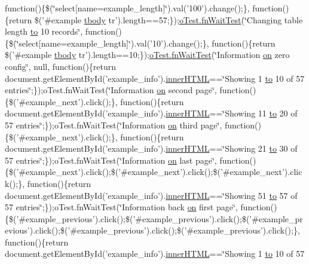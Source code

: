 \begin{DoxyCompactItemize}
function()\{\$(\char`\"{}select\mbox{[}name=example\+\_\+length\mbox{]}\char`\"{}).val('100').change();\}, function()\{return \$('\#example \hyperlink{core_8constructor_8js_a99b0542c7c50fe8757c55bf9dac5f3be}{tbody} tr').length==57;\});\hyperlink{onhold_24__server-side_2__zero__config_8js_ab25c4d596771c0133cdc45178ce72c3d}{o\+Test.\+fn\+Wait\+Test}(\char`\"{}Changing table length \hyperlink{jquery-ui_8js_af6086621f45baa2cf538f19e45d3c263}{to} 10 records\char`\"{}, function()\{\$(\char`\"{}select\mbox{[}name=example\+\_\+length\mbox{]}\char`\"{}).val('10').change();\}, function()\{return \$('\#example \hyperlink{core_8constructor_8js_a99b0542c7c50fe8757c55bf9dac5f3be}{tbody} tr').length==10;\});\hyperlink{onhold_24__server-side_2__zero__config_8js_ab25c4d596771c0133cdc45178ce72c3d}{o\+Test.\+fn\+Wait\+Test}(\char`\"{}Information \hyperlink{fullpage_2plugin_8min_8js_a1cfa98b7fed2aaf9fee3b68dbb7f9497}{on} zero config\char`\"{}, null, function()\{return document.\+get\+Element\+By\+Id('example\+\_\+info').\hyperlink{jquery-ui_8js_a87f73c4f0391c1cf9fe60374a76d9a7b}{inner\+H\+T\+M\+L}==\char`\"{}Showing 1 \hyperlink{jquery-ui_8js_af6086621f45baa2cf538f19e45d3c263}{to} 10 of 57 entries\char`\"{};\});o\+Test.\+fn\+Wait\+Test(\char`\"{}Information \hyperlink{fullpage_2plugin_8min_8js_a1cfa98b7fed2aaf9fee3b68dbb7f9497}{on} second page\char`\"{}, function()\{\$('\#example\+\_\+next').click();\}, function()\{return document.\+get\+Element\+By\+Id('example\+\_\+info').\hyperlink{jquery-ui_8js_a87f73c4f0391c1cf9fe60374a76d9a7b}{inner\+H\+T\+M\+L}==\char`\"{}Showing 11 \hyperlink{jquery-ui_8js_af6086621f45baa2cf538f19e45d3c263}{to} 20 of 57 entries\char`\"{};\});o\+Test.\+fn\+Wait\+Test(\char`\"{}Information \hyperlink{fullpage_2plugin_8min_8js_a1cfa98b7fed2aaf9fee3b68dbb7f9497}{on} third page\char`\"{}, function()\{\$('\#example\+\_\+next').click();\}, function()\{return document.\+get\+Element\+By\+Id('example\+\_\+info').\hyperlink{jquery-ui_8js_a87f73c4f0391c1cf9fe60374a76d9a7b}{inner\+H\+T\+M\+L}==\char`\"{}Showing 21 \hyperlink{jquery-ui_8js_af6086621f45baa2cf538f19e45d3c263}{to} 30 of 57 entries\char`\"{};\});o\+Test.\+fn\+Wait\+Test(\char`\"{}Information \hyperlink{fullpage_2plugin_8min_8js_a1cfa98b7fed2aaf9fee3b68dbb7f9497}{on} last page\char`\"{}, function()\{\$('\#example\+\_\+next').click();\$('\#example\+\_\+next').click();\$('\#example\+\_\+next').click();\}, function()\{return document.\+get\+Element\+By\+Id('example\+\_\+info').\hyperlink{jquery-ui_8js_a87f73c4f0391c1cf9fe60374a76d9a7b}{inner\+H\+T\+M\+L}==\char`\"{}Showing 51 \hyperlink{jquery-ui_8js_af6086621f45baa2cf538f19e45d3c263}{to} 57 of 57 entries\char`\"{};\});o\+Test.\+fn\+Wait\+Test(\char`\"{}Information back \hyperlink{fullpage_2plugin_8min_8js_a1cfa98b7fed2aaf9fee3b68dbb7f9497}{on} first page\char`\"{}, function()\{\$('\#example\+\_\+previous').click();\$('\#example\+\_\+previous').click();\$('\#example\+\_\+previous').click();\$('\#example\+\_\+previous').click();\$('\#example\+\_\+previous').click();\}, function()\{return document.\+get\+Element\+By\+Id('example\+\_\+info').\hyperlink{jquery-ui_8js_a87f73c4f0391c1cf9fe60374a76d9a7b}{inner\+H\+T\+M\+L}==\char`\"{}Showing 1 \hyperlink{jquery-ui_8js_af6086621f45baa2cf538f19e45d3c263}{to} 10 of 57 
\end{DoxyCompactItemize}
